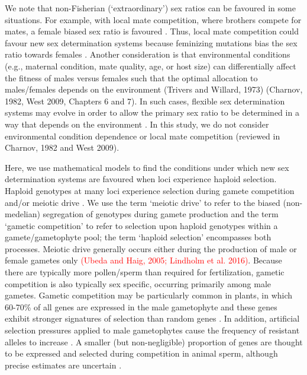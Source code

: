 \documentclass[12pt]{article}
\begin{document}
We note that non-Fisherian (`extraordinary') sex ratios can be favoured in some situations. 
For example, with local mate competition, where brothers compete for mates, a female biased sex ratio is favoured \citep{Hamilton:1967ts}. 
Thus, local mate competition could favour new sex determination systems because feminizing mutations bias the sex ratio towards females \citep{Wilson:1981vm,Vuillleumier:2007bh}. 
Another consideration is that environmental conditions (e.g., maternal condition, mate quality, age, or host size) can differentially affect the fitness of males versus females such that the optimal allocation to males/females depends on the environment (Trivers and Willard, 1973) \citep{Charnov:1977tx} (Charnov, 1982, West 2009, Chapters 6 and 7). 
In such cases, flexible sex determination systems may evolve in order to allow the primary sex ratio to be determined in a way that depends on the environment \citep{Charnov:1977tx,Werren:1984tl,Pen:2010kk}. 
In this study, we do not consider environmental condition dependence or local mate competition (reviewed in Charnov, 1982 and West 2009). 

Here, we use mathematical models to find the conditions under which new sex determination systems are favoured when loci experience haploid selection. 
Haploid genotypes at many loci experience selection during gamete competition and/or meiotic drive \citep{Mulcahy:1996ha,JOSEPH:2004haa}.
We use the term `meiotic drive' to refer to the biased (non-medelian) segregation of genotypes during gamete production and the term `gametic competition' to refer to selection upon haploid genotypes within a gamete/gametophyte pool; the term `haploid selection' encompasses both processes. 
Meiotic drive generally occurs either during the production of male or female gametes only \textcolor{red}{(Ubeda and Haig, 2005; Lindholm et al. 2016)}. 
Because there are typically more pollen/sperm than required for fertilization, gametic competition is also typically sex specific, occurring primarily among male gametes.
Gametic competition may be particularly common in plants, in which 60-70\% of all genes are expressed in the male gametophyte and these genes exhibit stronger signatures of selection than random genes \citep{Borg:2009jpa,Arunkumar:2013iq,Gossmann:2014dua}.
In addition, artificial selection pressures applied to male gametophytes cause the frequency of resistant alleles to increase \citep[e.g.,][]{Hormaza:1996cv,Ravikumar:2003uo,Hedhly:2004iv,Clarke:2004ir}. 
A smaller (but non-negligible) proportion of genes are thought to be expressed and selected during competition in animal sperm, although precise estimates are uncertain \citep{Zheng:2001fi,JOSEPH:2004haa,Vibranovski:2010et}. 
\end{document}
